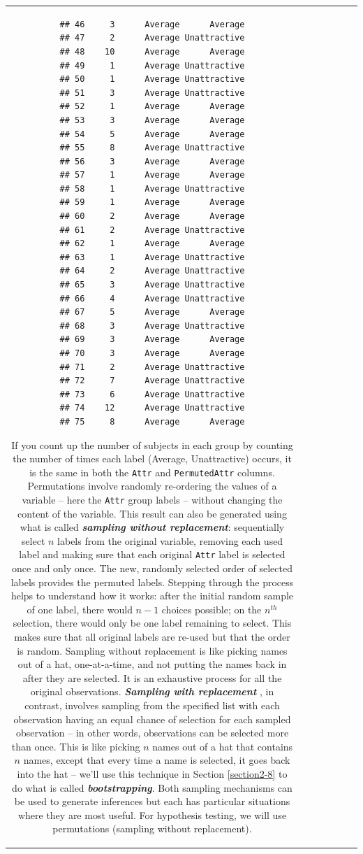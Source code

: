 \documentclass[]{book}
\theoremstyle{definition}
\theoremstyle{definition}
\theoremstyle{remark}
\begin{document}
\begin{longtable}[]{@{}ccccccc@{}}
\begin{minipage}[b]{0.10\columnwidth}
\begin{verbatim}
## 46     3      Average      Average
## 47     2      Average Unattractive
## 48    10      Average      Average
## 49     1      Average Unattractive
## 50     1      Average Unattractive
## 51     3      Average Unattractive
## 52     1      Average      Average
## 53     3      Average      Average
## 54     5      Average      Average
## 55     8      Average Unattractive
## 56     3      Average      Average
## 57     1      Average      Average
## 58     1      Average Unattractive
## 59     1      Average      Average
## 60     2      Average      Average
## 61     2      Average Unattractive
## 62     1      Average      Average
## 63     1      Average Unattractive
## 64     2      Average Unattractive
## 65     3      Average Unattractive
## 66     4      Average Unattractive
## 67     5      Average      Average
## 68     3      Average Unattractive
## 69     3      Average      Average
## 70     3      Average      Average
## 71     2      Average Unattractive
## 72     7      Average Unattractive
## 73     6      Average Unattractive
## 74    12      Average Unattractive
## 75     8      Average      Average
\end{verbatim}

If you count up the number of subjects in each group by counting the
number of times each label (Average, Unattractive) occurs, it is the
same in both the \texttt{Attr} and \texttt{PermutedAttr} columns.
Permutations involve randomly re-ordering the values of a variable --
here the \texttt{Attr} group labels -- without changing the content of
the variable. This result can also be generated using what is called
\textbf{\emph{sampling without replacement}}: sequentially select \(n\)
labels from the original variable, removing each used label and making
sure that each original \texttt{Attr} label is selected once and only
once. The new, randomly selected order of selected labels provides the
permuted labels. Stepping through the process helps to understand how it
works: after the initial random sample of one label, there would
\(n - 1\) choices possible; on the \(n^{th}\) selection, there would
only be one label remaining to select. This makes sure that all original
labels are re-used but that the order is random. Sampling without
replacement is like picking names out of a hat, one-at-a-time, and not
putting the names back in after they are selected. It is an exhaustive
process for all the original observations. \textbf{\emph{Sampling with
replacement}} , in contrast, involves sampling from the specified list
with each observation having an equal chance of selection for each
sampled observation -- in other words, observations can be selected more
than once. This is like picking \(n\) names out of a hat that contains
\(n\) names, except that every time a name is selected, it goes back
into the hat -- we'll use this technique in Section \ref{section2-8} to
do what is called \textbf{\emph{bootstrapping}}. Both sampling
mechanisms can be used to generate inferences but each has particular
situations where they are most useful. For hypothesis testing, we will
use permutations (sampling without replacement).


\end{minipage}
\end{longtable}
\end{document}
